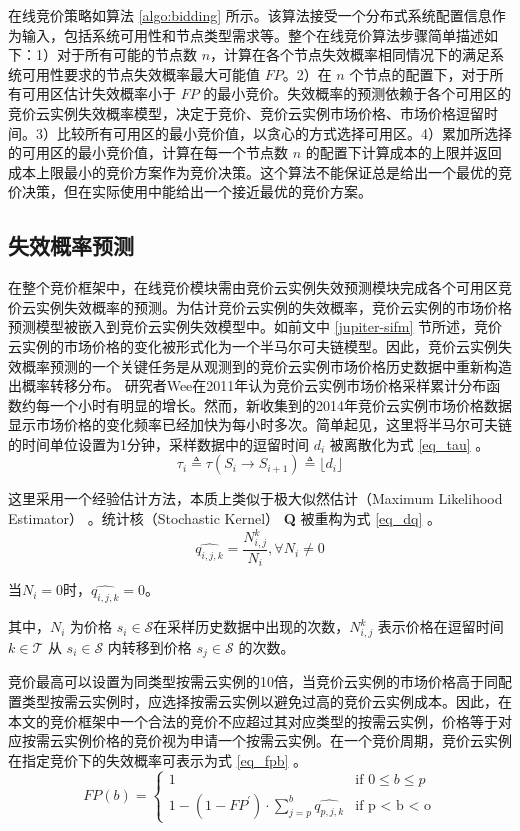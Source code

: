 在线竞价策略如算法 \ref{algo:bidding} 所示。该算法接受一个分布式系统配置信息作为输入，包括系统可用性和节点类型需求等。整个在线竞价算法步骤简单描述如下：1）对于所有可能的节点数 $n$，计算在各个节点失效概率相同情况下的满足系统可用性要求的节点失效概率最大可能值 $FP$。2）在 $n$ 个节点的配置下，对于所有可用区估计失效概率小于 $FP$ 的最小竞价。失效概率的预测依赖于各个可用区的竞价云实例失效概率模型，决定于竞价、竞价云实例市场价格、市场价格逗留时间。3）比较所有可用区的最小竞价值，以贪心的方式选择可用区。4）累加所选择的可用区的最小竞价值，计算在每一个节点数 $n$ 的配置下计算成本的上限并返回成本上限最小的竞价方案作为竞价决策。这个算法不能保证总是给出一个最优的竞价决策，但在实际使用中能给出一个接近最优的竞价方案。

\subsection{失效概率预测}
在整个竞价框架中，在线竞价模块需由竞价云实例失效预测模块完成各个可用区竞价云实例失效概率的预测。为估计竞价云实例的失效概率，竞价云实例的市场价格预测模型被嵌入到竞价云实例失效模型中。如前文中 \ref{jupiter-sifm} 节所述，竞价云实例的市场价格的变化被形式化为一个半马尔可夫链模型。因此，竞价云实例失效概率预测的一个关键任务是从观测到的竞价云实例市场价格历史数据中重新构造出概率转移分布。
研究者Wee\cite{5948651}在2011年认为竞价云实例市场价格采样累计分布函数约每一个小时有明显的增长。然而，新收集到的2014年竞价云实例市场价格数据显示市场价格的变化频率已经加快为每小时多次。简单起见，这里将半马尔可夫链的时间单位设置为1分钟，采样数据中的逗留时间 $d_i$ 被离散化为式 \eqref{eq_tau} 。
\begin{equation}\label{eq_tau}
\tau_i \triangleq \tau(S_i \rightarrow S_{i+1}) \triangleq \lfloor d_i \rfloor
\end{equation}

这里采用一个经验估计方法，本质上类似于极大似然估计（Maximum Likelihood Estimator） \cite{Barbu:2008:SCH:1481376}。统计核（Stochastic Kernel） \textbf{Q} 被重构为式 \eqref{eq_dq} 。
\begin{equation}\label{eq_dq}
\widehat{{q}_{i,j,k}} = \frac{N_{i, j}^{k}}{N_i}, \forall N_i \neq 0
\end{equation}

当$N_i = 0$时，$\widehat{{q}_{i,j,k}} = 0$。

其中，$N_i$ 为价格 $s_i \in \mathcal{S}$在采样历史数据中出现的次数，$N_{i, j}^{k}$ 表示价格在逗留时间 $k \in \mathcal{T}$ 从 $s_i \in \mathcal{S}$ 内转移到价格 $s_j \in \mathcal{S}$ 的次数。

竞价最高可以设置为同类型按需云实例的10倍，当竞价云实例的市场价格高于同配置类型按需云实例时，应选择按需云实例以避免过高的竞价云实例成本。因此，在本文的竞价框架中一个合法的竞价不应超过其对应类型的按需云实例，价格等于对应按需云实例价格的竞价视为申请一个按需云实例。在一个竞价周期，竞价云实例在指定竞价下的失效概率可表示为式 \eqref{eq_fpb} 。
\begin{equation}\label{eq_fpb}
FP(b) = 
\begin{cases}
1 &\mbox{if $0 \leq b \leq p$}\\
1 - (1 - FP^{\prime}) \cdot \sum\limits_{j=p}^b{\widehat{{q}_{p, j, k}}} &\mbox{if p < b < o}
\end{cases}
\end{equation}

